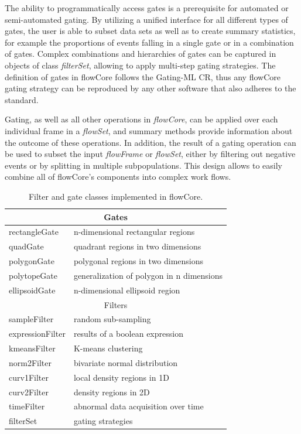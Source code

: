 \documentclass[12pt]{article}
\newcommand{\Rpackage}[1]{{\textsf{#1}}}
\newcommand{\Rclass}[1]{{\textit{#1}}}
\begin{document}
The ability to programmatically access gates is a prerequisite for
automated or semi-automated gating. By utilizing a unified interface
for all different types of gates, the user is able to subset data sets
as well as to create summary statistics, for example the proportions
of events falling in a single gate or in a combination of
gates. Complex combinations and hierarchies of gates can be captured
in objects of class \Rclass{filterSet}, allowing to apply multi-step
gating strategies. The definition of gates in \Rpackage{flowCore}
follows the Gating-ML CR, thus any \Rpackage{flowCore} gating strategy
can be reproduced by any other software that also adheres to the
standard.

Gating, as well as all other operations in \Rclass{flowCore}, can be
applied over each individual frame in a \Rclass{flowSet}, and summary
methods provide information about the outcome of these operations. In
addition, the result of a gating operation can be used to subset the
input \Rclass{flowFrame} or \Rclass{flowSet}, either by filtering out
negative events or by splitting in multiple subpopulations. This
design allows to easily combine all of \Rpackage{flowCore}'s
components into complex work flows.

\begin{table}[ht]
\begin{center}
\begin{tabular}{|l|l|}
\hline
\multicolumn{2}{|c|}{Gates} \\
\hline
rectangleGate & n-dimensional rectangular regions \\
quadGate & quadrant regions in two dimensions \\
polygonGate & polygonal regions in two dimensions \\
polytopeGate & generalization of polygon in n dimensions \\
ellipsoidGate & n-dimensional ellipsoid region \\
\hline
\multicolumn{2}{|c|}{Filters} \\
\hline
sampleFilter & random sub-sampling\\
expressionFilter & results of a boolean expression \\
kmeansFilter & K-means clustering \\
norm2Filter & bivariate normal distribution \\
curv1Filter & local density regions in 1D \\
curv2Filter & density regions in 2D \\
timeFilter & abnormal data acquisition over time \\
\hline
filterSet & gating strategies \\
\hline
\end{tabular}
\caption{\label{table2}Filter and gate classes implemented in
  \Rpackage{flowCore}.}
\end{center}
\end{table}
\end{document}
